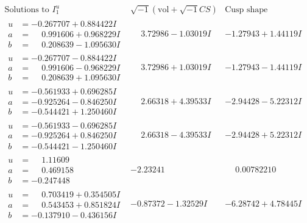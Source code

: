 \documentclass[1p]{elsarticle_modified}
\theoremstyle{definition}
\newcommand{\I}{\sqrt{-1}}
\begin{document}
$$\begin{array}{c|c|c}  
\text{Solutions to }I^u_{1}& \I (\text{vol} + \sqrt{-1}CS) & \text{Cusp shape}\\
 \hline 
\begin{aligned}
u &= -0.267707 + 0.884422 I \\
a &= \phantom{-}0.991606 + 0.968229 I \\
b &= \phantom{-}0.208639 - 1.095630 I\end{aligned}
 & \phantom{-}3.72986 - 1.03019 I & -1.27943 + 1.44119 I \\ \hline\begin{aligned}
u &= -0.267707 - 0.884422 I \\
a &= \phantom{-}0.991606 - 0.968229 I \\
b &= \phantom{-}0.208639 + 1.095630 I\end{aligned}
 & \phantom{-}3.72986 + 1.03019 I & -1.27943 - 1.44119 I \\ \hline\begin{aligned}
u &= -0.561933 + 0.696285 I \\
a &= -0.925264 - 0.846250 I \\
b &= -0.544421 + 1.250460 I\end{aligned}
 & \phantom{-}2.66318 + 4.39533 I & -2.94428 - 5.22312 I \\ \hline\begin{aligned}
u &= -0.561933 - 0.696285 I \\
a &= -0.925264 + 0.846250 I \\
b &= -0.544421 - 1.250460 I\end{aligned}
 & \phantom{-}2.66318 - 4.39533 I & -2.94428 + 5.22312 I \\ \hline\begin{aligned}
u &= \phantom{-}1.11609\phantom{ +0.000000I} \\
a &= \phantom{-}0.469158\phantom{ +0.000000I} \\
b &= -0.247448\phantom{ +0.000000I}\end{aligned}
 & -2.23241\phantom{ +0.000000I} & \phantom{-}0.00782210\phantom{ +0.000000I} \\ \hline\begin{aligned}
u &= \phantom{-}0.703419 + 0.354505 I \\
a &= \phantom{-}0.543453 + 0.851824 I \\
b &= -0.137910 - 0.436156 I\end{aligned}
 & -0.87372 - 1.32529 I & -6.28742 + 4.78445 I \\ \hline\begin{aligned}

\end{aligned}
\end{array}$$
\end{document}
